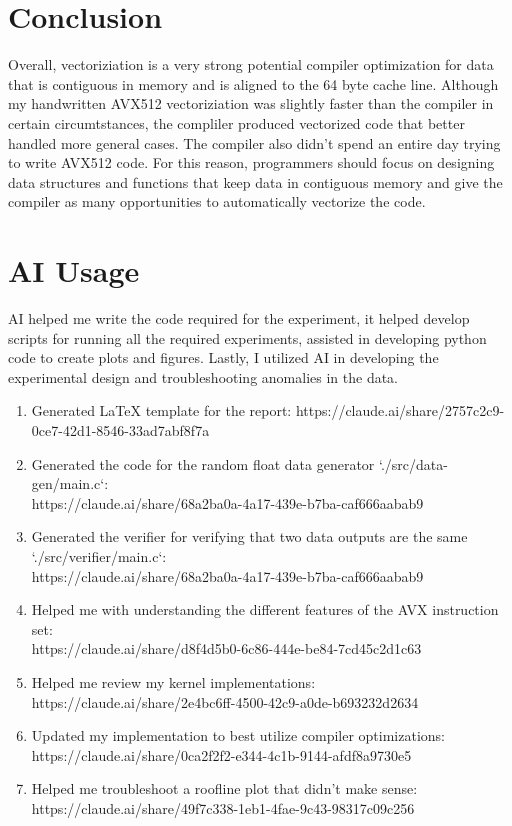\documentclass[11pt]{article}
\begin{document}
\section{Conclusion}

Overall, vectoriziation is a very strong potential compiler optimization for data that is contiguous in memory and is
aligned to the 64 byte cache line. Although my handwritten AVX512 vectoriziation was slightly faster than the compiler
in certain circumtstances, the compliler produced vectorized code that better handled more general cases. The compiler
also didn't spend an entire day trying to write AVX512 code. For this reason, programmers should focus on designing
data structures and functions that keep data in contiguous memory and give the compiler as many opportunities to
automatically vectorize the code.

\appendix

\section{AI Usage}

AI helped me write the code required for the experiment, it helped develop scripts for running all the required
experiments, assisted in developing python code to create plots and figures. Lastly, I utilized AI in developing the
experimental design and troubleshooting anomalies in the data.

\begin{enumerate}
	\item Generated LaTeX template for the report: https://claude.ai/share/2757c2c9-0ce7-42d1-8546-33ad7abf8f7a
	\item Generated the code for the random float data generator `./src/data-gen/main.c`: \\
	      https://claude.ai/share/68a2ba0a-4a17-439e-b7ba-caf666aabab9
	\item Generated the verifier for verifying that two data outputs are the same `./src/verifier/main.c`: \\
	      https://claude.ai/share/68a2ba0a-4a17-439e-b7ba-caf666aabab9
	\item Helped me with understanding the different features of the AVX instruction set: \\
	      https://claude.ai/share/d8f4d5b0-6c86-444e-be84-7cd45c2d1c63
	\item Helped me review my kernel implementations: https://claude.ai/share/2e4bc6ff-4500-42c9-a0de-b693232d2634
	\item Updated my implementation to best utilize compiler optimizations: \\
	      https://claude.ai/share/0ca2f2f2-e344-4c1b-9144-afdf8a9730e5
	\item Helped me troubleshoot a roofline plot that didn't make sense: \\
	      https://claude.ai/share/49f7c338-1eb1-4fae-9c43-98317c09c256
\end{enumerate}
\end{document}
